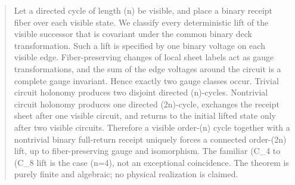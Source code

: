 \begin{abstract}
Let a directed cycle of length (n) be visible, and place a binary
receipt fiber over each visible state. We classify every deterministic lift
of the visible successor that is covariant under the common binary deck
transformation. Such a lift is specified by one binary voltage on each
visible edge. Fiber-preserving changes of local sheet labels act as gauge
transformations, and the sum of the edge voltages around the circuit is a
complete gauge invariant. Hence exactly two gauge classes occur. Trivial
circuit holonomy produces two disjoint directed (n)-cycles. Nontrivial
circuit holonomy produces one directed (2n)-cycle, exchanges the receipt
sheet after one visible circuit, and returns to the initial lifted state only
after two visible circuits. Therefore a visible order-(n) cycle together
with a nontrivial binary full-return receipt uniquely forces a connected
order-(2n) lift, up to fiber-preserving gauge and isomorphism. The familiar
(C_4\) to (C_8\) lift is the case (n=4), not an exceptional coincidence.
The theorem is purely finite and algebraic; no physical realization is
claimed.
\end{abstract}

